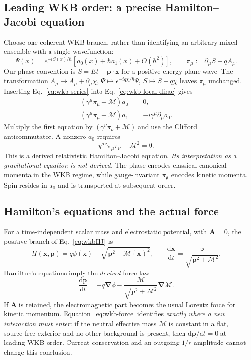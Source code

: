 \documentclass[11pt,a4paper]{article}
\newcommand{\dd}{\mathrm d}
\begin{document}
\subsection{Leading WKB order: a precise Hamilton--Jacobi equation}
Choose one coherent WKB branch, rather than identifying an arbitrary mixed ensemble with a single wavefunction:
\begin{equation}\label{eq:wkb-series}
\Psi(x)=e^{-iS(x)/\hbar}\left[a_0(x)+\hbar a_1(x)+O(\hbar^2)\right],\qquad
\pi_\mu:=\partial_\mu S-qA_\mu.
\end{equation}
Our phase convention is $S=Et-\bm p\cdot\bm x$ for a positive-energy plane wave.  The transformation $A_\mu\mapsto A_\mu+\partial_\mu\chi$, $\Psi\mapsto e^{-iq\chi/\hbar}\Psi$, $S\mapsto S+q\chi$ leaves $\pi_\mu$ unchanged.  Inserting Eq.~\eqref{eq:wkb-series} into Eq.~\eqref{eq:wkb-local-dirac} gives
\begin{align}
(\gamma^\mu\pi_\mu-\mathcal M)a_0&=0,\label{eq:wkb-leading-spinor}\\
(\gamma^\mu\pi_\mu-\mathcal M)a_1&=-i\gamma^\mu\partial_\mu a_0.\label{eq:wkb-next-spinor}
\end{align}
Multiply the first equation by $(\gamma^\nu\pi_\nu+\mathcal M)$ and use the Clifford anticommutator.  A nonzero $a_0$ requires
\begin{equation}\label{eq:wkbHJ}
\boxed{\eta^{\mu\nu}\pi_\mu\pi_\nu+\mathcal M^2=0.}
\end{equation}
This is a derived relativistic Hamilton--Jacobi equation.  \emph{Its interpretation as a gravitational equation is not derived.}  The phase encodes classical canonical momenta in the WKB regime, while gauge-invariant $\pi_\mu$ encodes kinetic momenta.  Spin resides in $a_0$ and is transported at subsequent order.

\subsection{Hamilton's equations and the actual force}\label{sec:wkb-force}
For a time-independent scalar mass and electrostatic potential, with $\bm A=0$, the positive branch of Eq.~\eqref{eq:wkbHJ} is
\begin{equation}\label{eq:wkb-energy}
H(\bm x,\bm p)=q\phi(\bm x)+\sqrt{\bm p^2+\mathcal M(\bm x)^2},
\qquad \frac{\dd\bm x}{\dd t}=\frac{\bm p}{\sqrt{\bm p^2+\mathcal M^2}}.
\end{equation}
Hamilton's equations imply the \emph{derived} force law
\begin{equation}\label{eq:wkb-force}
\boxed{\frac{\dd\bm p}{\dd t}=-q\bm\nabla\phi
-\frac{\mathcal M}{\sqrt{\bm p^2+\mathcal M^2}}\bm\nabla\mathcal M.}
\end{equation}
If $\bm A$ is retained, the electromagnetic part becomes the usual Lorentz force for kinetic momentum.  Equation~\eqref{eq:wkb-force} identifies \emph{exactly where a new interaction must enter}: if the neutral effective mass $\mathcal M$ is constant in a flat, source-free exterior and no other background is present, then $\dd\bm p/\dd t=0$ at leading WKB order.  Current conservation and an outgoing $1/r$ amplitude cannot change this conclusion.
\end{document}
